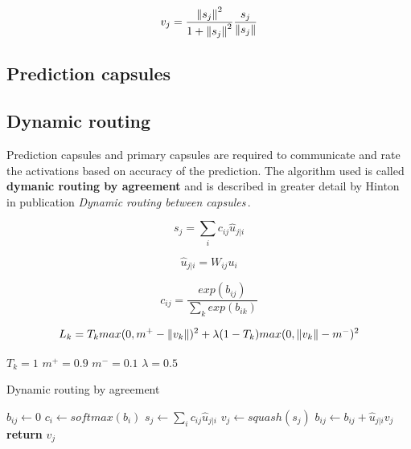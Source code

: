 \begin{equation}
    v_j = \frac{\left\lVert s_j \right\rVert^2}{1 + \left\lVert s_j \right\rVert^2} \frac{s_j}{\left\lVert s_j \right\rVert}
    \label{eq:squash}
\end{equation}

\subsection{Prediction capsules}

\subsection{Dynamic routing}

Prediction capsules and primary capsules are required to communicate and rate the activations based on accuracy of the prediction. The algorithm used is called \textbf{dymanic routing by agreement} and is described in greater detail by Hinton in publication \textit{Dynamic routing between capsules}\,\cite{capsule}.


\begin{equation}
    s_j = \sum_{i}c_{ij}\hat{u}_{j|i}
\end{equation}

\begin{equation}
    \hat{u}_{j|i} = W_{ij}u_i
\end{equation}

\begin{equation}
    c_{ij} = \frac{exp(b_{ij})}{\sum_{k}exp(b_{ik})}
    \label{eq:softmax}
\end{equation}

\begin{equation}
    L_k = T_k max(0, m^+ - \left\lVert v_k \right\rVert)^2 + \lambda (1 - T_k) max(0, \left\lVert v_k \right\rVert - m^-)^2 \\
\end{equation}

$T_k = 1$ $m^+ = 0.9$ $m^- = 0.1$ $\lambda = 0.5$

\begin{algorithm}[H]
    \caption{Dynamic routing by agreement}\label{alg:routing}
    \begin{algorithmic}[1]
         $b_{ij}\gets 0$ \EndFor
             $c_{i}\gets softmax(b_i)$ \EndFor
             $s_{j}\gets \sum_ic_{ij}\hat{u}_{j|i}$ \EndFor
             $v_{j}\gets squash(s_j)$ \EndFor
             $b_{ij}\gets b_{ij} + \hat{u}_{j|i} v_j$ \EndFor
        \EndFor
        \State \textbf{return} $v_j$
    \EndProcedure
    \end{algorithmic}
\end{algorithm}

